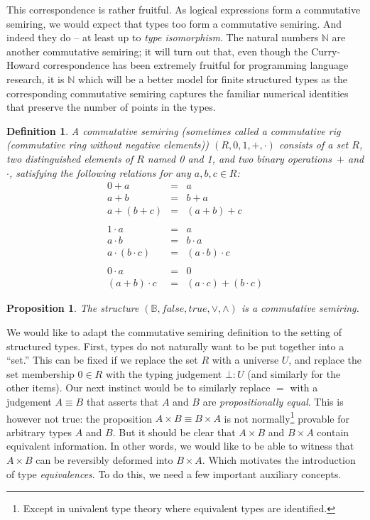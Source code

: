 \documentclass{article}
\newtheorem{defn}{Definition}[section]
\newtheorem{prop}{Proposition}[section]
\newcommand{\Nat}{\ensuremath{\mathbb{N}}}
\newcommand{\true}{\mathit{true}}
\newcommand{\false}{\mathit{false}}
\begin{document}
\noindent This correspondence is rather fruitful. As logical
expressions form a commutative semiring, we would expect that types
too form a commutative semiring. And indeed they do -- at least up to
\emph{type isomorphism}.  The natural numbers $\Nat$ are another
commutative semiring; it will turn out that, even though the
Curry-Howard correspondence has been extremely fruitful for
programming language research, it is $\Nat$ which will be a better
model for finite structured types as the corresponding commutative
semiring captures the familiar numerical identities that preserve the
number of points in the types.

\begin{defn}
\label{def:rig}
A \emph{commutative semiring} (sometimes called a \emph{commutative
  rig} (commutative ri\emph{n}g without negative elements))
$(R,0,1,+,\cdot)$ consists of a set $R$, two distinguished elements of
$R$ named 0 and 1, and two binary operations~$+$ and $\cdot$,
satisfying the following relations for any $a,b,c \in R$:
\[\begin{array}{rcl}
0 + a &=& a \\
a + b &=& b + a \\
a + (b + c) &=& (a + b) + c \\
\\
1 \cdot a &=& a \\
a \cdot b &=& b \cdot a \\
a \cdot (b \cdot c) &=& (a \cdot b) \cdot c \\
\\
0 \cdot a &=& 0 \\
(a + b) \cdot c &=& (a \cdot c) + (b \cdot c)
\end{array}\]
\end{defn}

\begin{prop}
The structure $\left(\mathbb{B}, \false, \true, \lor, \land\right)$
is a commutative semiring.
\end{prop}

We would like to adapt the commutative semiring definition to the
setting of structured types. First, types do not naturally want to be
put together into a ``set.''  This can be fixed if we replace the set
$R$ with a universe $U$, and replace the set membership $0 \in R$ with
the typing judgement $\bot : U$ (and similarly for the other
items). Our next instinct would be to similarly replace $=$ with a
judgement $A \equiv B$ that asserts that $A$ and $B$ are
\emph{propositionally equal}. This is however not true: the
proposition $A \times B \equiv B \times A$ is not
normally\footnote{Except in univalent type theory where equivalent
  types are identified.} provable for arbitrary types $A$ and $B$. But
it should be clear that $A \times B$ and $B \times A$ contain
equivalent information. In other words, we would like to be able to
witness that $A \times B$ can be reversibly deformed into
$B \times A$. Which motivates the introduction of type
\emph{equivalences}. To do this, we need a few important auxiliary
concepts.
\end{document}
